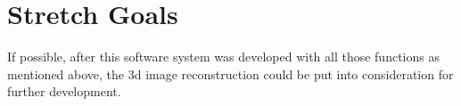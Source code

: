 \documentclass{article}
\begin{document}
\section{Stretch Goals}

If possible, after this software system was developed with all those functions as mentioned above, the 3d image reconstruction could be put into consideration for further development.\\
\end{document}
